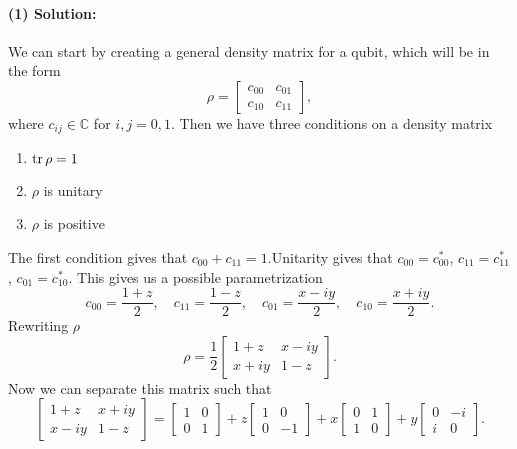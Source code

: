 \paragraph{(1) Solution:} We can start by creating a general density matrix for a qubit, which will be in the form
\begin{equation}
    \rho = \begin{bmatrix}
        c_{00} & c_{01}\\
        c_{10} & c_{11}
    \end{bmatrix},
\end{equation}
where $c_{ij} \in \mathbb{C}$ for $i,j = 0,1$. Then we have three conditions on a density matrix
\begin{enumerate}[label=\textit{\roman*}., leftmargin=2cm]\singlespacing
    \item $\tr\rho = 1$
    \item $\rho$ is unitary
    \item $\rho$ is positive
\end{enumerate}
The first condition gives that $c_{00} + c_{11} = 1$.Unitarity gives that $c_{00} = c_{00}^*$, $c_{11} = c_{11}^*$, $c_{01} = c_{10}^*$. This gives us a possible parametrization 
\begin{equation}
        c_{00} = \frac{1+z}{2}, \quad c_{11} = \frac{1-z}{2}, \quad c_{01} = \frac{x - iy}{2}, \quad c_{10} = \frac{x+iy}{2}.
\end{equation}
Rewriting $\rho$
\begin{equation}
    \rho = \frac{1}{2}
    \begin{bmatrix}
        1+z & x - iy\\
        x + iy & 1- z    
    \end{bmatrix}.\label{eq:param}
\end{equation}
Now we can separate this matrix such that
\begin{equation}
    \begin{bmatrix}
        1+z & x+ iy\\
        x - iy & 1- z    
    \end{bmatrix}
    =
    \begin{bmatrix}
        1 & 0\\
        0 & 1
    \end{bmatrix}
    +z
    \begin{bmatrix}
        1 & 0\\
        0 & -1
    \end{bmatrix}
    +x
    \begin{bmatrix}
        0 & 1\\
        1 & 0
    \end{bmatrix}
    +y
    \begin{bmatrix}
        0 & -i\\
        i & 0
    \end{bmatrix}.
\end{equation}
